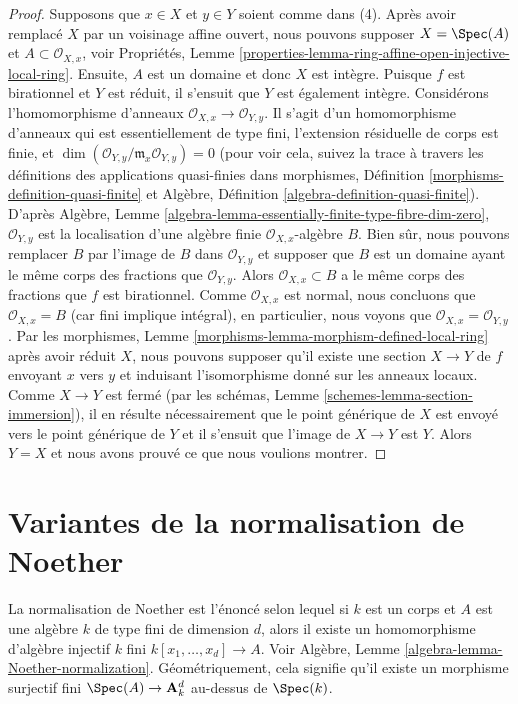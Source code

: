 \begin{proof}
\medskip\noindent
Supposons que $x \in X$ et $y \in Y$ soient comme dans (4). Après
avoir remplacé $X$ par un voisinage affine ouvert, nous pouvons
supposer $X = \Spec(A)$ et $A \subset \mathcal{O}_{X, x}$, voir
Propriétés, Lemme
\ref{properties-lemma-ring-affine-open-injective-local-ring}.
Ensuite, $A$ est un domaine et donc $X$ est intègre. Puisque $f$
est birationnel et $Y$ est réduit, il s'ensuit que $Y$ est
également intègre. Considérons l'homomorphisme d'anneaux
$\mathcal{O}_{X, x} \to \mathcal{O}_{Y, y}$. Il s'agit d'un
homomorphisme d'anneaux qui est essentiellement de type fini,
l'extension résiduelle de corps est finie, et $\dim(\mathcal{O}_{Y,
y}/\mathfrak m_x\mathcal{O}_{Y, y}) = 0$ (pour voir cela, suivez la
trace à travers les définitions des applications quasi-finies dans
morphismes, Définition \ref{morphisms-definition-quasi-finite} et
Algèbre, Définition \ref{algebra-definition-quasi-finite}). D'après
Algèbre, Lemme
\ref{algebra-lemma-essentially-finite-type-fibre-dim-zero},
$\mathcal{O}_{Y, y}$ est la localisation d'une algèbre finie
$\mathcal{O}_{X, x}$-algèbre $B$. Bien sûr, nous pouvons remplacer $B$ par
l'image de $B$ dans $\mathcal{O}_{Y, y}$ et supposer que $B$ est un
domaine ayant le même corps des fractions que $\mathcal{O}_{Y, y}$. Alors
$\mathcal{O}_{X, x} \subset B$ a le même corps des fractions que $f$ est
birationnel. Comme $\mathcal{O}_{X, x}$ est normal, nous concluons que
$\mathcal{O}_{X, x} = B$ (car fini implique intégral), en particulier, nous
voyons que $\mathcal{O}_{X, x} = \mathcal{O}_{Y, y}$. Par les morphismes,
Lemme \ref{morphisms-lemma-morphism-defined-local-ring} après avoir réduit
$X$, nous pouvons supposer qu'il existe une section $X \to Y$ de $f$
envoyant $x$ vers $y$ et induisant l'isomorphisme donné sur les anneaux
locaux. Comme $X \to Y$ est fermé (par les schémas, Lemme
\ref{schemes-lemma-section-immersion}), il en résulte nécessairement que le point
générique de $X$ est envoyé vers le point générique de $Y$ et il s'ensuit que l'image
de $X \to Y$ est $Y$. Alors $Y = X$ et nous avons prouvé ce que nous voulions montrer.
\end{proof}






\section{Variantes de la normalisation de Noether}
\label{section-noether-normalization}

\noindent
La normalisation de Noether est l'énoncé selon
lequel si $k$ est un corps et $A$ est une algèbre
$k$ de type fini de dimension $d$, alors il existe
un homomorphisme d'algèbre injectif $k$ fini $k[x_1,
\ldots, x_d] \to A$. Voir Algèbre, Lemme
\ref{algebra-lemma-Noether-normalization}.
Géométriquement, cela signifie qu'il existe un morphisme
surjectif fini $\Spec(A) \to \mathbf{A}^d_k$ au-dessus de $\Spec(k)$.

